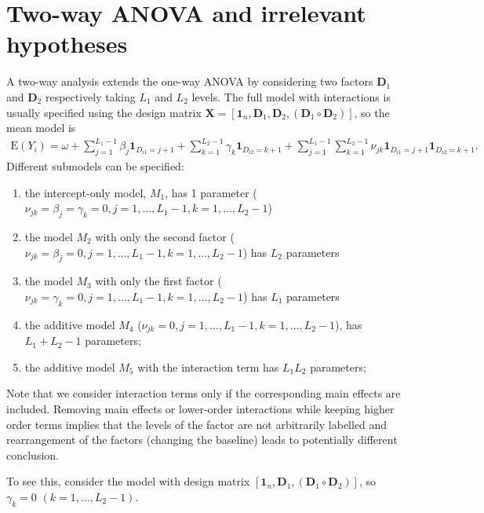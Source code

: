 \documentclass[]{book}
\providecommand{\tightlist}{%
  \setlength{\itemsep}{0pt}\setlength{\parskip}{0pt}}
\theoremstyle{definition}
\theoremstyle{definition}
\theoremstyle{definition}
\theoremstyle{remark}
\begin{document}
\hypertarget{two-way-anova-and-irrelevant-hypotheses}{%
\section{Two-way ANOVA and irrelevant hypotheses}\label{two-way-anova-and-irrelevant-hypotheses}}

A two-way analysis extends the one-way ANOVA by considering two factors \(\mathbf{D}_1\) and \(\mathbf{D}_2\) respectively taking \(L_1\) and \(L_2\) levels.
The full model with interactions is usually specified using the design matrix
\(\mathbf{X} = [\mathbf{1}_n, \mathbf{D}_{1}, \mathbf{D}_2, (\mathbf{D}_1\circ \mathbf{D}_2) ]\), so the mean model is
\begin{align*}
  \mathrm{E}(Y_{i})= \omega + \sum_{j=1}^{L_1-1} \beta_j{\mathbf 1}_{D_{i1}=j+1} + \sum_{k=1}^{L_2-1}
  \gamma_k{\mathbf 1}_{D_{i2}=k+1} + \sum_{j=1}^{L_1-1}\sum_{k=1}^{L_2-1} \nu_{jk}{\mathbf 1}_{D_{i1}=j+1}{\mathbf 1}_{D_{i2}=k+1}.
 \end{align*}
Different submodels can be specified:

\begin{enumerate}
\def\labelenumi{\roman{enumi}.}
\tightlist
\item
  the intercept-only model, \(M_1\), has 1 parameter (\(\nu_{jk}=\beta_j=\gamma_k=0, j=1, \ldots, L_1-1, k = 1, \ldots, L_2-1\))
\item
  the model \(M_2\) with only the second factor (\(\nu_{jk}=\beta_j=0, j=1, \ldots, L_1-1, k = 1, \ldots, L_2-1\)) has \(L_2\) parameters
\item
  the model \(M_3\) with only the first factor (\(\nu_{jk}=\gamma_k=0, j=1, \ldots, L_1-1, k = 1, \ldots, L_2-1\)) has \(L_1\) parameters
\item
  the additive model \(M_4\) (\(\nu_{jk}=0, j=1, \ldots, L_1-1, k = 1, \ldots, L_2-1\)), has \(L_1+L_2-1\) parameters;
\item
  the additive model \(M_5\) with the interaction term has \(L_1L_2\) parameters;
\end{enumerate}

Note that we consider interaction terms only if the corresponding main effects are included. Removing main effects or lower-order
interactions while keeping higher order terms implies that the levels of the factor are not arbitrarily labelled and
rearrangement of the factors (changing the baseline) leads to potentially different conclusion.

To see this, consider the model with design matrix
\([\mathbf{1}_n, \mathbf{D}_{1}, (\mathbf{D}_1\circ \mathbf{D}_2)]\), so
\(\gamma_k=0\) \((k = 1, \ldots, L_2-1)\).
\end{document}
